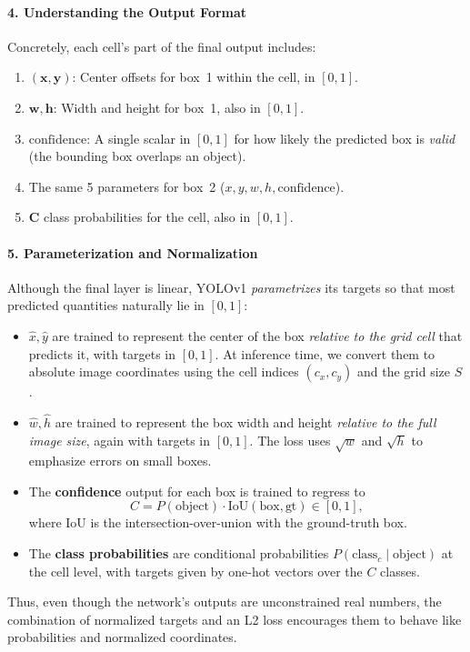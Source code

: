 \begin{enrichment}
\begin{enrichment}
    \paragraph{4. Understanding the Output Format}
    Concretely, each cell’s part of the final output includes:
    \begin{enumerate}
        \item \(\mathbf{(x, y)}\): Center offsets for box~1 within the cell, in \([0,1]\).
        \item \(\mathbf{w, h}\): Width and height for box~1, also in \([0,1]\).
        \item \(\text{confidence}\): A single scalar in \([0,1]\) for how likely the predicted box is \textit{valid} (the bounding box overlaps an object).
        \item The same 5 parameters for box~2 (\(x, y, w, h, \text{confidence}\)).
        \item \(\mathbf{C}\) class probabilities for the cell, also in \([0,1]\).
    \end{enumerate}
    
    \paragraph{5. Parameterization and Normalization}
    Although the final layer is linear, YOLOv1 \emph{parametrizes} its targets so that most predicted quantities naturally lie in \([0,1]\):
    \begin{itemize}
    	\item \(\hat{x}, \hat{y}\) are trained to represent the center of the box \textit{relative to the grid cell} that predicts it, with targets in \([0,1]\). At inference time, we convert them to absolute image coordinates using the cell indices \((c_x, c_y)\) and the grid size \(S\).
    	\item \(\hat{w}, \hat{h}\) are trained to represent the box width and height \textit{relative to the full image size}, again with targets in \([0,1]\). The loss uses \(\sqrt{w}\) and \(\sqrt{h}\) to emphasize errors on small boxes.
    	\item The \textbf{confidence} output for each box is trained to regress to
    	\[
    	C = P(\text{object}) \cdot \mathrm{IoU}(\text{box}, \text{gt}) \in [0,1],
    	\]
    	where \(\mathrm{IoU}\) is the intersection-over-union with the ground-truth box.
    	\item The \textbf{class probabilities} are conditional probabilities \(P(\text{class}_c \mid \text{object})\) at the cell level, with targets given by one-hot vectors over the \(C\) classes.
    \end{itemize}
    Thus, even though the network’s outputs are unconstrained real numbers, the combination of normalized targets and an L2 loss encourages them to behave like probabilities and normalized coordinates.
    

\end{enrichment}
\end{enrichment}
